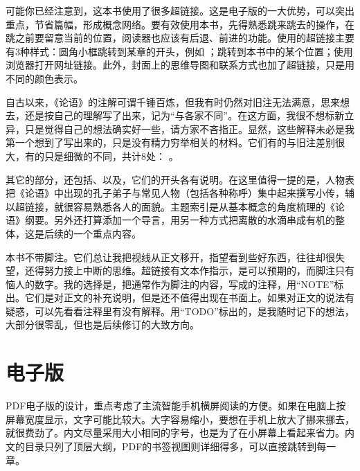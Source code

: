 可能你已经注意到，这本书使用了很多超链接。这是电子版的一大优势，可以突出重点，节省篇幅，形成概念网络。要有效使用本书，先得熟悉跳来跳去的操作，在跳之前要留意当前的位置，阅读器也应该有后退、前进的功能。使用的超链接主要有3种样式：圆角小框跳转到某章的开头，例如 ；跳转到本书中的某个位置；使用浏览器打开网址链接。此外，封面上的思维导图和联系方式也加了超链接，只是用\textcolor{\lycoverlinkcolor}{不同的颜色}表示。

自古以来，《论语》的注解可谓千锤百炼，但我有时仍然对旧注无法满意，思来想去，还是按自己的理解写了出来，记为“与各家不同”。在这方面，我很不想标新立异，只是觉得自己的想法确实好一些，请方家不吝指正。显然，这些解释未必是我第一个想到了写出来的，只是没有精力穷举相关的材料。它们有的与旧注差别很大，有的只是细微的不同，共计8处：       。

其它的部分，还包括、以及，它们的开头各有说明。在这里值得一提的是，人物表把《论语》中出现的孔子弟子与常见人物（包括各种称呼）集中起来撰写小传，辅以超链接，就很容易熟悉各人的面貌。主题索引是从基本概念的角度梳理的《论语》纲要。另外还打算添加一个导言，用另一种方式把离散的水滴串成有机的整体，这是后续的一个重点内容。

本书不带脚注。它们总让我把视线从正文移开，指望看到些好东西，往往却很失望，还得努力接上中断的思维。超链接有文本作指示，是可以预期的，而脚注只有恼人的数字。我的选择是，把通常作为脚注的内容，写成的注释，用“NOTE”标出。它们是对正文的补充说明，但是还不值得出现在书面上。如果对正文的说法有疑惑，可以先看看注释里有没有解释。用“TODO”标出的，是我随时记下的想法，大部分很零乱，但也是后续修订的大致方向。



\lypdfbookmark\section*{电子版}

PDF电子版的设计，重点考虑了主流智能手机横屏阅读的方便。如果在电脑上按屏幕宽度显示，文字可能比较大。大字容易缩小，要想在手机上放大了挪来挪去，就很费劲了。内文尽量采用大小相同的字号，也是为了在小屏幕上看起来省力。内文的目录只列了顶层大纲，PDF的书签视图则详细得多，可以直接跳转到每一章。

